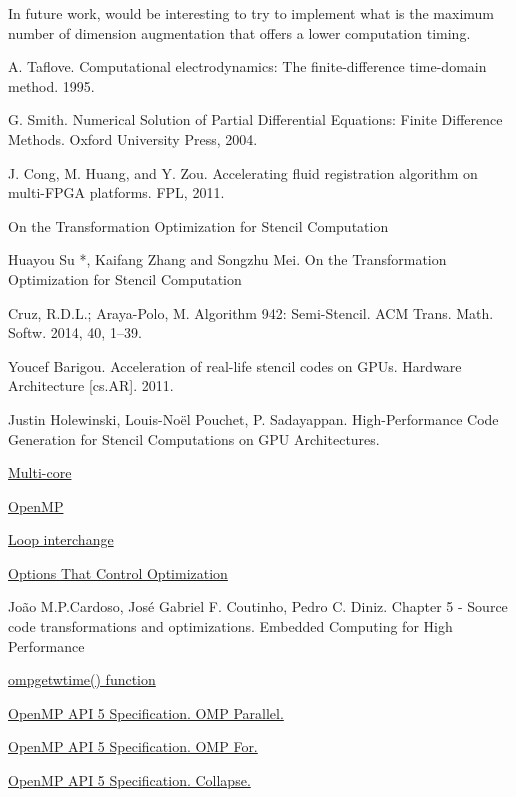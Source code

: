 \documentclass[conference]{IEEEtran}
\begin{document}
In future work, would be interesting to try to implement what is the maximum number of dimension augmentation that offers a lower computation timing.


\begin{thebibliography}{1}

A. Taflove. Computational electrodynamics: The finite-difference time-domain method. 1995.

G. Smith. Numerical Solution of Partial Differential Equations: Finite Difference Methods. Oxford University Press, 2004.

J. Cong, M. Huang, and Y. Zou. Accelerating fluid registration algorithm on multi-FPGA platforms. FPL, 2011.

On the Transformation Optimization for Stencil Computation

Huayou Su *, Kaifang Zhang and Songzhu Mei. On the Transformation Optimization for Stencil Computation

Cruz, R.D.L.; Araya-Polo, M. Algorithm 942: Semi-Stencil. ACM Trans. Math. Softw. 2014, 40, 1–39.

Youcef Barigou. Acceleration of real-life stencil codes on GPUs. Hardware Architecture [cs.AR]. 2011.

Justin Holewinski, Louis-Noël Pouchet, P. Sadayappan. High-Performance Code Generation for Stencil Computations on GPU Architectures.

\href{https://www.techopedia.com/definition/5305/multicore}{Multi-core}

\href{https://www.openmp.org/}{OpenMP}

\href{https://en.wikipedia.org/wiki/Loop_interchange}{Loop interchange}

\href{https://gcc.gnu.org/onlinedocs/gcc/Optimize-Options.html}{Options That Control Optimization}
 
João M.P.Cardoso, José Gabriel F. Coutinho, Pedro C. Diniz. Chapter 5 - Source code transformations and optimizations. Embedded Computing for High Performance

\href{https://www.openmp.org/spec-html/5.0/openmpsu160.html}{omp\textunderscore get\textunderscore wtime() function}

\href{https://www.openmp.org/specifications/}{OpenMP API 5 Specification. OMP Parallel.}

\href{https://www.openmp.org/specifications/}{OpenMP API 5 Specification. OMP For.}

\href{https://www.openmp.org/specifications/}{OpenMP API 5 Specification. Collapse.}

\end{thebibliography}
\end{document}
